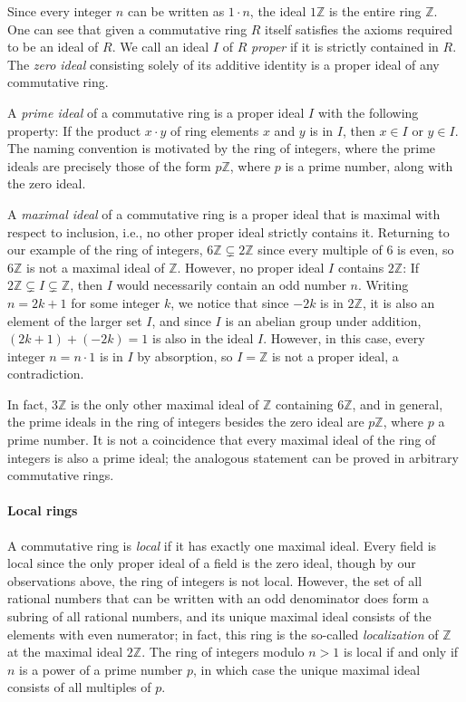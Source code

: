\documentclass{article}
\begin{document}
Since every integer $n$ can be written as $1 \cdot n$, the ideal $1 \mathbb{Z}$
is the entire ring $\mathbb{Z}$. One can see that given a commutative ring
$R$ itself satisfies the axioms required to be an ideal of $R$. We call an
ideal $I$ of $R$ \emph{proper} if it is strictly contained in $R$. The
\emph{zero ideal} consisting solely of its additive identity is a proper ideal
of any commutative ring. 

A \emph{prime ideal} of a commutative ring is a proper ideal $I$ with the
following property:   If the product $x \cdot y$ of ring elements $x$ and $y$
is in $I$, then $x \in I$ or $y \in I$. The naming convention is motivated by
the ring of integers, where the prime ideals are precisely those  of the form
$p\mathbb{Z}$, where $p$ is a prime number, along with the zero ideal. 

A \emph{maximal ideal} of a commutative ring is a proper ideal that is maximal
with respect to inclusion, i.e., no other proper ideal strictly contains it. 
Returning to our example of the ring of integers,
$6 \mathbb{Z} \subsetneq 2 \mathbb{Z}$ since every multiple of $6$ is even, so
$6 \mathbb{Z}$ is not a maximal ideal of $\mathbb{Z}$. However, no proper ideal
$I$ contains $2 \mathbb{Z}$: If $2\mathbb{Z}\subsetneq I\subsetneq \mathbb{Z}$,
then $I$  would necessarily contain an odd number $n$. Writing $n=2k+1$ for
some integer $k$, we notice that since $-2k$ is in $2\mathbb{Z}$, it is also an
element of the larger set $I$, and since $I$ is an abelian group under
addition, $(2k+1) + (-2k) = 1$ is also in the ideal $I$. However, in this case,
every integer $n = n \cdot 1$ is in $I$ by absorption, so $I = \mathbb{Z}$ is
not a proper ideal, a contradiction. 

In fact, $3 \mathbb{Z}$ is the only other maximal ideal of $\mathbb{Z}$
containing $6 \mathbb{Z}$, and in general, the prime ideals in the ring of
integers besides the zero ideal are  $p \mathbb{Z}$, where $p$ a prime number. 
It is not a coincidence that every maximal ideal of the ring of integers is
also a prime  ideal; the analogous statement can be proved in arbitrary
commutative rings.

\paragraph{Local rings}
A commutative ring is \emph{local} if it has exactly one maximal ideal. 
Every field is local since the only proper ideal of a field is the zero ideal,
though by our observations above, the ring of integers is not local. 
However, the set of all rational numbers that can be written with an odd
denominator does form a subring of all rational numbers, and its unique maximal
ideal consists of the elements with even numerator; in fact, this ring is the
so-called \emph{localization} of $\mathbb{Z}$ at the maximal ideal
$2\mathbb{Z}$. The ring of integers modulo $n>1$ is local if and only if $n$ is
a power of a prime number $p$, in which case the unique maximal ideal consists
of all multiples of $p$. 
\end{document}
